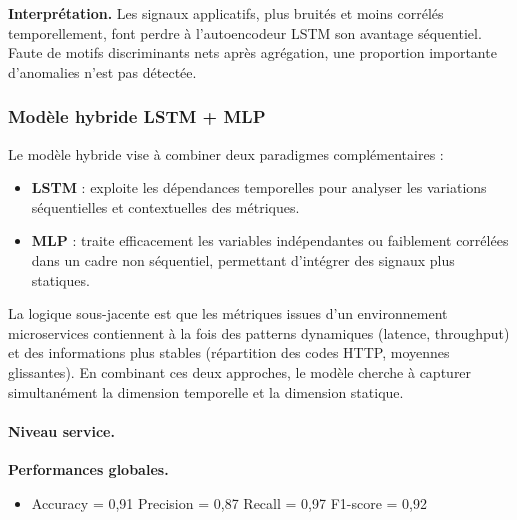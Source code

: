 \documentclass[conference]{IEEEtran}
\begin{document}
\textbf{Interprétation.}
Les signaux applicatifs, plus bruités et moins corrélés temporellement, font perdre à l’autoencodeur LSTM son avantage séquentiel.  
Faute de motifs discriminants nets après agrégation, une proportion importante d’anomalies n’est pas détectée.
\FloatBarrier


\subsubsection{\textbf{Modèle hybride LSTM + MLP}}

Le modèle hybride vise à combiner deux paradigmes complémentaires :
\begin{itemize}
    \item \textbf{LSTM} : exploite les dépendances temporelles pour analyser les variations séquentielles et contextuelles des métriques.
    \item \textbf{MLP} : traite efficacement les variables indépendantes ou faiblement corrélées dans un cadre non séquentiel, permettant d’intégrer des signaux plus statiques.
\end{itemize}
La logique sous-jacente est que les métriques issues d’un environnement microservices contiennent à la fois des patterns dynamiques (latence, throughput) et des informations plus stables (répartition des codes HTTP, moyennes glissantes). En combinant ces deux approches, le modèle cherche à capturer simultanément la dimension temporelle et la dimension statique.

\paragraph{Niveau service.}

\textbf{Performances globales.}
\begin{itemize}
    \item Accuracy = 0{,}91 \quad
          Precision = 0{,}87 \quad
          Recall = 0{,}97 \quad
          F1-score = 0{,}92
\end{itemize}
\end{document}
